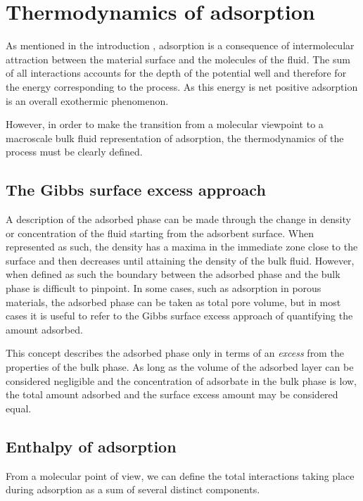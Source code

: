
\section{Thermodynamics of adsorption}

As mentioned in the introduction , adsorption 
is a consequence of intermolecular attraction between the 
material surface and the molecules of the fluid. The sum of 
all interactions accounts for the depth of the potential 
well and therefore for the energy corresponding to the 
process. As this energy is net positive adsorption is an
overall exothermic phenomenon.

However, in order to make the transition from a molecular 
viewpoint to a macroscale bulk fluid representation of 
adsorption, the thermodynamics of the process must be 
clearly defined.

\subsection{The Gibbs surface excess approach}

A description of the adsorbed phase can be made through the change
in density or concentration of the fluid starting from the 
adsorbent surface. When represented as such, the density 
has a maxima in the immediate zone close to the surface and then
decreases until attaining the density of the bulk fluid.
However, when defined as such the boundary between the 
adsorbed phase and the bulk phase is difficult to pinpoint.
In some cases, such as adsorption in porous materials, the 
adsorbed phase can be taken as total pore volume, but in 
most cases it is useful to refer to the Gibbs surface 
excess approach of quantifying the amount adsorbed.

This concept describes the adsorbed phase only in terms
of an \textit{excess} from the properties of the bulk phase. 
As long as the volume of the adsorbed layer can be considered 
negligible and the concentration of adsorbate in the bulk 
phase is low, the total amount adsorbed and the surface excess
amount may be considered equal.

\subsection{Enthalpy of adsorption}

From a molecular point of view, we can define the total
interactions taking place during adsorption as a sum of 
several distinct components.

